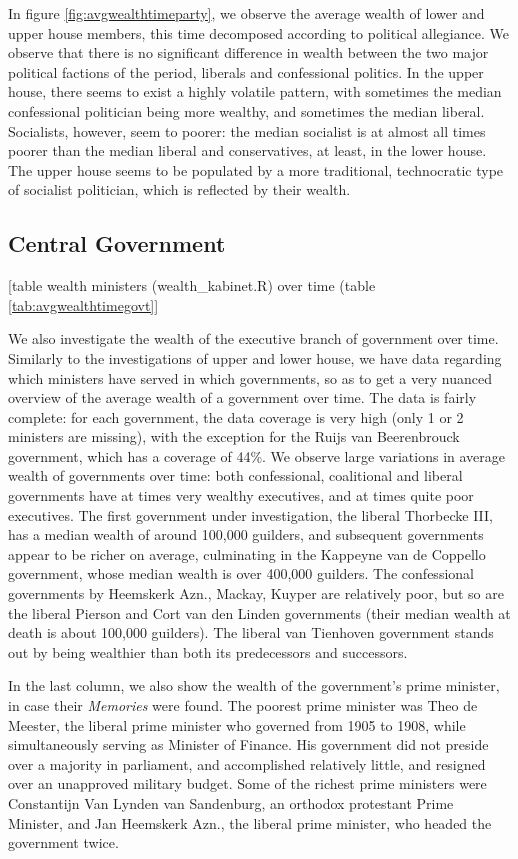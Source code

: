     In figure \ref{fig:avgwealthtimeparty}, we observe the average wealth of lower and upper house members, this time decomposed according to political allegiance. We observe that there is no significant difference in wealth between the two major political factions of the period, liberals and confessional politics. In the upper house, there seems to exist a highly volatile pattern, with sometimes the median confessional politician being more wealthy, and sometimes the median liberal. Socialists, however, seem to poorer: the median socialist is at almost all times poorer than the median liberal and conservatives, at least, in the lower house. The upper house seems to be populated by a more traditional, technocratic type of socialist politician, which is reflected by their wealth. 
    
\subsection{Central Government}
\begin{center}
    [table wealth ministers (wealth\_kabinet.R) over time (table \ref{tab:avgwealthtimegovt}]
 \end{center}   
    We also investigate the wealth of the executive branch of government over time. Similarly to the investigations of upper and lower house, we have data regarding which ministers have served in which governments, so as to get a very nuanced overview of the average wealth of a government over time. The data is fairly complete: for each government, the data coverage is very high (only 1 or 2 ministers are missing), with the exception for the Ruijs van Beerenbrouck government, which has a coverage of 44\%. We observe large variations in average wealth of governments over time: both confessional, coalitional and liberal governments have at times very wealthy executives, and at times quite poor executives. The first government under investigation, the liberal Thorbecke III, has a median wealth of around 100,000 guilders, and subsequent governments appear to be richer on average, culminating in the Kappeyne van de Coppello government, whose median wealth is over 400,000 guilders. The confessional governments by Heemskerk Azn., Mackay, Kuyper are relatively poor, but so are the liberal Pierson and Cort van den Linden governments (their median wealth at death is about 100,000 guilders). The liberal van Tienhoven government stands out by being wealthier than both its predecessors and successors. 
    
    In the last column, we also show the wealth of the government's prime minister, in case their \textit{Memories} were found. The poorest prime minister was Theo de Meester, the liberal prime minister  who governed from 1905 to 1908, while simultaneously serving as Minister of Finance. His government did not preside over a majority in parliament, and accomplished relatively little, and resigned over an unapproved military budget. Some of the richest prime ministers were Constantijn Van Lynden van Sandenburg, an orthodox protestant Prime Minister, and Jan Heemskerk Azn., the liberal prime minister, who headed the government twice. 
    
